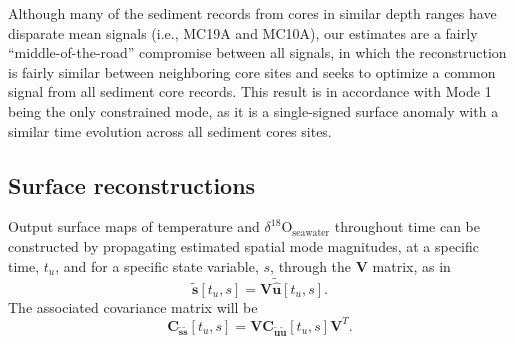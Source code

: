 \documentclass[draft]{agujournal2019}
\begin{document}
Although many of the sediment records from cores in similar depth ranges have disparate mean signals (i.e., MC19A and MC10A), our estimates are a fairly ``middle-of-the-road'' compromise between all signals, in which the reconstruction is fairly similar between neighboring core sites and seeks to optimize a common signal from all sediment core records. This result is in accordance with Mode 1 being the only constrained mode, as it is a single-signed surface anomaly with a similar time evolution across all sediment cores sites. 
\subsection{Surface reconstructions \label{sec:surfrecon}}
Output surface maps of temperature and $\delta^{18}\mathrm{O}_{\mathrm{seawater}}$ throughout time can be constructed by propagating estimated spatial mode magnitudes, at a specific time, $t_u$, and for a specific state variable, $s$, through the $\mathbf{V}$ matrix, as in
\begin{equation}
\label{eq:surfrecon}
  \mathbf{\tilde{s}}[t_u, s] = \mathbf{V \tilde{\hat{u}}}[t_u, s]. 
\end{equation}
The associated covariance matrix will be
\begin{equation}
\label{eq:surfreconunc}
\mathbf{C_{\tilde{s}\tilde{s}}}[t_u, s] = \mathbf{V C_{\tilde{u}\tilde{u}}}[t_u, s]\mathbf{V}^T.
\end{equation}
\end{document}
